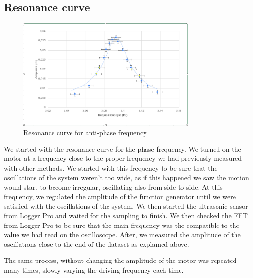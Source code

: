 \documentclass{article}
\begin{document}
\subsection{Resonance curve}
\begin{figure}
  \begin{center}
    \includegraphics[width=0.8\textwidth]{lorentz_contro}
  \end{center}
  \label{img:res_contro}
  \caption{Resonance curve for anti-phase frequency}
\end{figure}
We started with the resonance curve for the phase frequency. We turned on the motor at a frequency close to the proper frequency we had previously measured with other methods. We started with this frequency to be sure that the oscillations of the system weren't too wide, as if this happened we saw the motion would start to become irregular, oscillating also from side to side. At this frequency, we regulated the amplitude of the function generator until we were satisfied with the oscillations of the system. We then started the ultrasonic sensor from Logger Pro and waited for the sampling to finish. We then checked the FFT from Logger Pro to be sure that the main frequency was the compatible to the value we had read on the oscilloscope. After, we measured the amplitude of the oscillations close to the end of the dataset as explained above. 

The same process, without changing the amplitude of the motor was repeated many times, slowly varying the driving frequency each time. 
\end{document}
